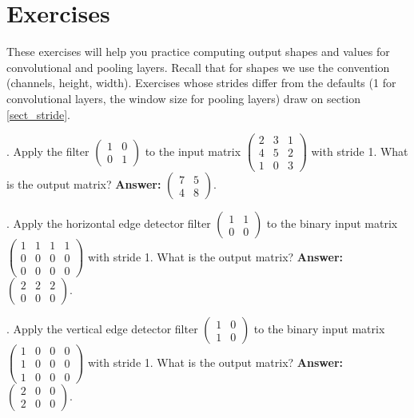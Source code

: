 \section{Exercises}

These exercises will help you practice computing output shapes and values for convolutional and pooling layers. Recall that for shapes we use the convention (channels, height, width). Exercises whose strides differ from the defaults (1 for convolutional layers, the window size for pooling layers) draw on section \ref{sect_stride}.

\bigskip


\label{cnnEx1}
\noindent
{\bf \theCNNCounter}. Apply the filter $\begin{pmatrix} 1 & 0 \\ 0 & 1 \end{pmatrix}$ to the input matrix $\begin{pmatrix} 2 & 3 & 1 \\ 4 & 5 & 2 \\ 1 & 0 & 3 \end{pmatrix}$ with stride 1. What is the output matrix? {\bf Answer:} $\begin{pmatrix} 7 & 5 \\ 4 & 8 \end{pmatrix}$.

\bigskip

\noindent
{\bf \theCNNCounter}. Apply the horizontal edge detector filter $\begin{pmatrix} 1 & 1 \\ 0 & 0 \end{pmatrix}$ to the binary input matrix $\begin{pmatrix} 1 & 1 & 1 & 1 \\ 0 & 0 & 0 & 0 \\ 0 & 0 & 0 & 0 \end{pmatrix}$ with stride 1. What is the output matrix? {\bf Answer:} $\begin{pmatrix} 2 & 2 & 2 \\ 0 & 0 & 0 \end{pmatrix}$.

\bigskip

\noindent
{\bf \theCNNCounter}. Apply the vertical edge detector filter $\begin{pmatrix} 1 & 0 \\ 1 & 0 \end{pmatrix}$ to the binary input matrix $\begin{pmatrix} 1 & 0 & 0 & 0 \\ 1 & 0 & 0 & 0 \\ 1 & 0 & 0 & 0 \end{pmatrix}$ with stride 1. What is the output matrix? {\bf Answer:} $\begin{pmatrix} 2 & 0 & 0 \\ 2 & 0 & 0 \end{pmatrix}$.

